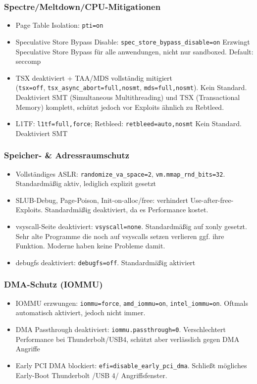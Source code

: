 \subsubsection*{Spectre/Meltdown/CPU-Mitigationen}
\begin{itemize}
  \item Page Table Isolation: \texttt{pti=on}
  \item Speculative Store Bypass Disable: \texttt{spec\_store\_bypass\_disable=on} Erzwingt Speculative Store Bypass für alle anwendungen, nicht nur sandboxed. Default: seccomp
  \item TSX deaktiviert + TAA/MDS vollständig mitigiert\\
  (\texttt{tsx=off}, \texttt{tsx\_async\_abort=full,nosmt}, \texttt{mds=full,nosmt}). Kein Standard. Deaktiviert SMT (Simultaneous Multithreading) und TSX (Transactional Memory) komplett, schützt jedoch vor Exploits ähnlich zu Rebtleed. 
  \item L1TF: \texttt{l1tf=full,force}; Retbleed: \texttt{retbleed=auto,nosmt} Kein Standard. Deaktiviert SMT 
\end{itemize}

\subsubsection*{Speicher- \& Adressraumschutz}
\begin{itemize}
  \item Vollständiges ASLR: \texttt{\textcolor{OliveGreen}{randomize\_va\_space=2}}, \texttt{\textcolor{OliveGreen}{vm.mmap\_rnd\_bits=32}}. Standardmäßig aktiv, lediglich explizit gesetzt
  \item SLUB-Debug, Page-Poison, Init-on-alloc/free: verhindert Use-after-free-Exploits. Standardmäßig deaktiviert, da es Performance kostet.
  \item vsyscall-Seite deaktiviert: \texttt{vsyscall=none}. Standardmäßig auf xonly gesetzt. Sehr alte Programme die noch auf vsyscalls setzen verlieren ggf. ihre Funktion. Moderne haben keine Probleme damit.
  \item debugfs deaktiviert: \texttt{debugfs=off}. Standardmäßig aktiviert
\end{itemize}

\subsubsection*{DMA-Schutz (IOMMU)}
\begin{itemize}
  \item IOMMU erzwungen: \texttt{iommu=force}, \texttt{amd\_iommu=on}, \texttt{intel\_iommu=on}. Oftmals automatisch aktiviert, jedoch nicht immer.
  \item DMA Passthrough deaktiviert: \texttt{iommu.passthrough=0}. Verschlechtert Performance bei Thunderbolt/USB4, schützt aber verlässlich gegen DMA Angriffe
  \item Early PCI DMA blockiert: \texttt{efi=disable\_early\_pci\_dma}. Schließt mögliches Early-Boot Thunderbolt /USB 4/ Angriffsfenster.
\end{itemize}

